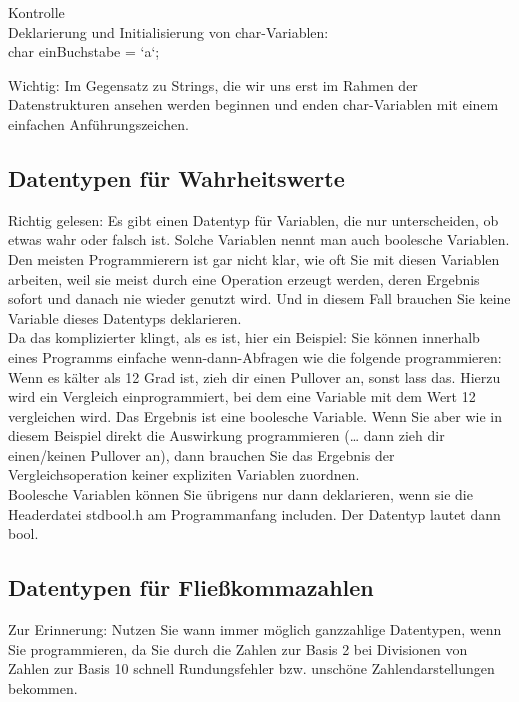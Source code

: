 Kontrolle\\

Deklarierung und Initialisierung von char-Variablen:\\


char einBuchstabe = `a`;

Wichtig: Im Gegensatz zu Strings, die wir uns erst im Rahmen der Datenstrukturen ansehen werden beginnen und enden char-Variablen mit einem einfachen Anführungszeichen.\\


\subsection{Datentypen für Wahrheitswerte}

Richtig gelesen: Es gibt einen Datentyp für Variablen, die nur unterscheiden, ob etwas wahr oder falsch ist. Solche Variablen nennt man auch boolesche Variablen. Den meisten Programmierern ist gar nicht klar, wie oft Sie mit diesen Variablen arbeiten, weil sie meist durch eine Operation erzeugt werden, deren Ergebnis sofort und danach nie wieder genutzt wird. Und in diesem Fall brauchen Sie keine Variable dieses Datentyps deklarieren.\\

Da das komplizierter klingt, als es ist, hier ein Beispiel: Sie können innerhalb eines Programms einfache wenn-dann-Abfragen wie die folgende programmieren: Wenn es kälter als 12 Grad ist, zieh dir einen Pullover an, sonst lass das. Hierzu wird ein Vergleich einprogrammiert, bei dem eine Variable mit dem Wert 12 vergleichen wird. Das Ergebnis ist eine boolesche Variable. Wenn Sie aber wie in diesem Beispiel direkt die Auswirkung programmieren (… dann zieh dir einen/keinen Pullover an), dann brauchen Sie das Ergebnis der Vergleichsoperation keiner expliziten Variablen zuordnen.\\

Boolesche Variablen können Sie übrigens nur dann deklarieren, wenn sie die Headerdatei stdbool.h am Programmanfang includen. Der Datentyp lautet dann bool.\\

\subsection{Datentypen für Fließkommazahlen}

Zur Erinnerung: Nutzen Sie wann immer möglich ganzzahlige Datentypen, wenn Sie programmieren, da Sie durch die Zahlen zur Basis 2 bei Divisionen von Zahlen zur Basis 10 schnell Rundungsfehler bzw. unschöne Zahlendarstellungen bekommen.\\

